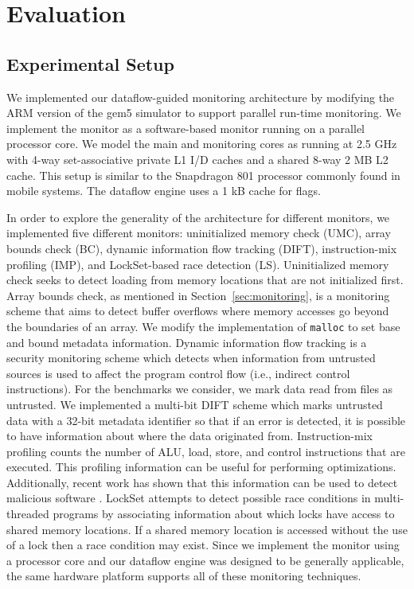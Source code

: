 \section{Evaluation}
\label{sec:evaluation}

\subsection{Experimental Setup}
\label{sec:evaluation.setup}

We implemented our dataflow-guided monitoring architecture by
modifying the ARM version of the gem5 simulator \cite{gem5} to support parallel
run-time monitoring. We implement the monitor as a software-based monitor
running on a parallel processor core. We model the main and monitoring cores as
running at 2.5
GHz with 4-way set-associative private L1 I/D caches and a shared 8-way 2 MB L2
cache. This setup is similar to the Snapdragon 801 processor commonly found in
mobile systems. The dataflow engine uses a 1 kB cache for flags.

In order to explore the generality of the architecture for
different monitors, we implemented five different monitors: uninitialized
memory check (UMC), array bounds check (BC), dynamic information flow
tracking (DIFT), instruction-mix profiling (IMP), and LockSet-based race detection (LS).  Uninitialized memory
check seeks to detect loading from
memory locations that are not initialized first. Array bounds check, as
mentioned in Section~\ref{sec:monitoring}, is a monitoring scheme that aims to
detect buffer overflows where memory accesses go beyond the boundaries of an
array. We modify the implementation of {\tt malloc} to set base and bound
metadata information. Dynamic information flow tracking is a security
monitoring scheme
which detects when information from untrusted sources is used to affect the
program control flow (i.e., indirect control instructions). For the benchmarks we consider, we mark data read from
files as untrusted. We implemented a multi-bit DIFT scheme which marks
untrusted data with a 32-bit metadata identifier so
that if an error is detected, it is possible to have information about where
the data originated from. Instruction-mix profiling counts the number of ALU,
load, store, and control instructions that are executed. This profiling
information can be useful for performing optimizations. Additionally, recent
work has shown that this information can be used to detect malicious software \cite{tang-raid14}.
LockSet attempts to detect possible race conditions in multi-threaded programs
by associating information about which locks have access to shared memory
locations. If a shared memory location is accessed without the use of a lock
then a race condition may exist. Since we implement the monitor using a
processor core and our dataflow engine was designed to be generally applicable,
the same hardware platform supports all of these monitoring techniques.

